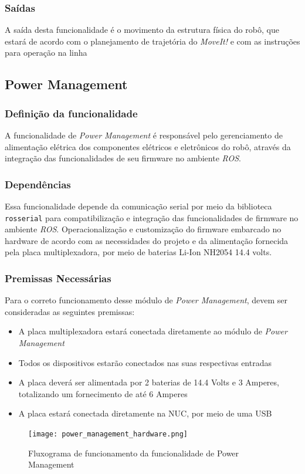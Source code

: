 \subsubsection{Saídas}
A saída desta funcionalidade é o movimento da estrutura física do robô, que estará de acordo com o planejamento de trajetória do \textit{MoveIt!} e com as instruções para operação na linha

\subsection{Power Management}
\label{ssec:power}
\subsubsection{Definição da funcionalidade}

A funcionalidade de \textit{Power Management} é responsável pelo gerenciamento de alimentação elétrica dos componentes elétricos e eletrônicos do robô, através da integração das funcionalidades de seu firmware no ambiente \textit{ROS}.
\subsubsection{Dependências}
Essa funcionalidade depende da comunicação serial por meio da biblioteca \verb|rosserial| para compatibilização e integração das funcionalidades de firmware no ambiente \textit{ROS}. Operacionalização e customização do firmware embarcado no hardware de acordo com as necessidades do projeto e da alimentação fornecida pela placa multiplexadora, por meio de baterias Li-Ion NH2054 14.4 volts.

\subsubsection{Premissas Necessárias}
Para o correto funcionamento desse módulo de \textit{Power Management}, devem ser consideradas as seguintes premissas:
\begin{itemize}
	\item A placa multiplexadora estará conectada diretamente ao módulo de \textit{Power Management} 
	\item Todos os dispositivos estarão conectados nas suas respectivas entradas
	\item A placa deverá ser alimentada por 2 baterias de 14.4 Volts e 3 Amperes, totalizando um fornecimento de até 6 Amperes
	\item A placa estará conectada diretamente na NUC, por meio de uma USB	
	
\end{itemize}
\begin{figure}[h]
	\centering
	\texttt{[image: power\_management\_hardware.png]}
	\caption{Fluxograma de funcionamento da funcionalidade de Power Management}
	\label{fig:power_management_hardware}
\end{figure}
